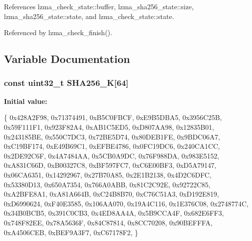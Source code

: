 References lzma\-\_\-check\-\_\-state\-::buffer, lzma\-\_\-sha256\-\_\-state\-::size, lzma\-\_\-sha256\-\_\-state\-::state, and lzma\-\_\-check\-\_\-state\-::state.



Referenced by lzma\-\_\-check\-\_\-finish().



\subsection{Variable Documentation}
\subsubsection[{S\-H\-A256\-\_\-\-K}]{\setlength{\rightskip}{0pt plus 5cm}const uint32\-\_\-t S\-H\-A256\-\_\-\-K[64]\hspace{0.3cm}{\ttfamily [static]}}\label{sha256_8c_ab8f3ad1f1c5d0564c306a6714b2e4d08}
{\bfseries Initial value\-:}
\begin{DoxyCode}
 \{
        0x428A2F98, 0x71374491, 0xB5C0FBCF, 0xE9B5DBA5,
        0x3956C25B, 0x59F111F1, 0x923F82A4, 0xAB1C5ED5,
        0xD807AA98, 0x12835B01, 0x243185BE, 0x550C7DC3,
        0x72BE5D74, 0x80DEB1FE, 0x9BDC06A7, 0xC19BF174,
        0xE49B69C1, 0xEFBE4786, 0x0FC19DC6, 0x240CA1CC,
        0x2DE92C6F, 0x4A7484AA, 0x5CB0A9DC, 0x76F988DA,
        0x983E5152, 0xA831C66D, 0xB00327C8, 0xBF597FC7,
        0xC6E00BF3, 0xD5A79147, 0x06CA6351, 0x14292967,
        0x27B70A85, 0x2E1B2138, 0x4D2C6DFC, 0x53380D13,
        0x650A7354, 0x766A0ABB, 0x81C2C92E, 0x92722C85,
        0xA2BFE8A1, 0xA81A664B, 0xC24B8B70, 0xC76C51A3,
        0xD192E819, 0xD6990624, 0xF40E3585, 0x106AA070,
        0x19A4C116, 0x1E376C08, 0x2748774C, 0x34B0BCB5,
        0x391C0CB3, 0x4ED8AA4A, 0x5B9CCA4F, 0x682E6FF3,
        0x748F82EE, 0x78A5636F, 0x84C87814, 0x8CC70208,
        0x90BEFFFA, 0xA4506CEB, 0xBEF9A3F7, 0xC67178F2,
\}
\end{DoxyCode}

